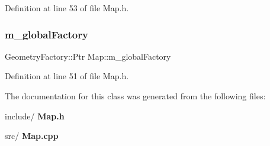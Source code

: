 Definition at line 53 of file Map.\+h.

\mbox{\label{class_map_ac5f30e6c144955a3638192495fd7d843}} 
\subsubsection{m\+\_\+global\+Factory}
{\footnotesize\ttfamily Geometry\+Factory\+::\+Ptr Map\+::m\+\_\+global\+Factory\hspace{0.3cm}{\ttfamily [private]}}



Definition at line 51 of file Map.\+h.



The documentation for this class was generated from the following files\+:\begin{DoxyCompactItemize}
\item 
include/\textbf{ Map.\+h}\item 
src/\textbf{ Map.\+cpp}\end{DoxyCompactItemize}
